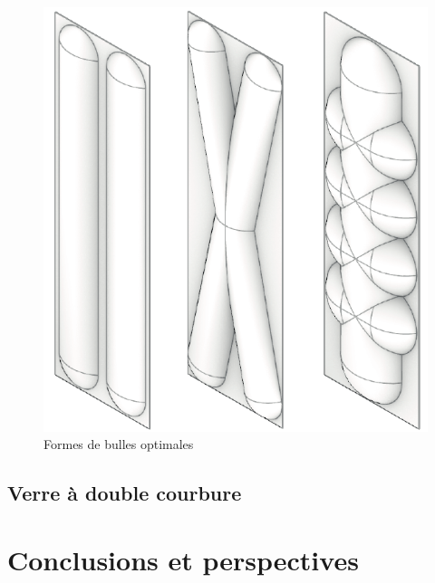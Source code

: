 \documentclass[11pt,titlepage]{article}
\begin{document}
\begin{figure}
    \centering
    \includegraphics[width=\linewidth]{img/bulle/opti_bulle.pdf}
    \caption{Formes de bulles optimales}
    \label{fig:opti_bulle1}
    \vspace{-10pt}
    \end{figure}


\newpage
\subsection{Verre à double courbure}

\newpage

\section{Conclusions et perspectives}
\end{document}
